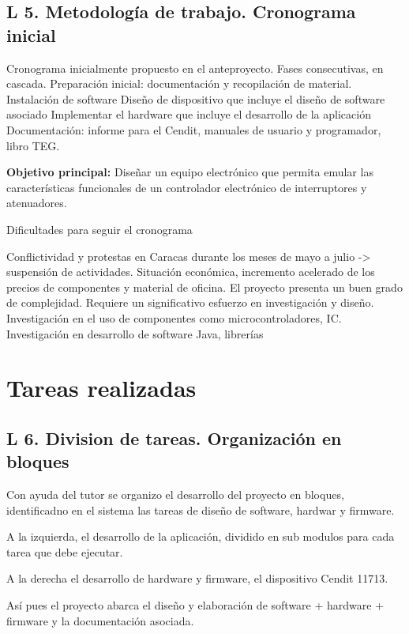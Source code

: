 \documentclass[paper=letter,oneside,fontsize=9pt]{scrartcl}
\begin{document}
	\subsection{L 5. Metodología de trabajo. Cronograma inicial}
	
	Cronograma inicialmente propuesto en el anteproyecto. Fases consecutivas, en cascada. 
	Preparación inicial: documentación y recopilación de material. Instalación de software
	Diseño de dispositivo que incluye el diseño de software asociado
	Implementar el hardware que incluye el desarrollo de la aplicación
	Documentación: informe para el Cendit, manuales de usuario y programador, libro TEG.
	
	\textbf{Objetivo principal:} Diseñar un equipo electrónico que permita emular las características funcionales de un controlador electrónico de interruptores y atenuadores.
	
	Dificultades para seguir el cronograma
	
	Conflictividad y protestas en Caracas durante los meses de mayo a julio -> suspensión de actividades.
	Situación económica, incremento acelerado de los precios de componentes y material de oficina.
	El proyecto presenta un buen grado de complejidad. Requiere un significativo esfuerzo en investigación y diseño. Investigación en el uso de componentes como microcontroladores, IC. Investigación en desarrollo de software Java, librerías
	
	\section{Tareas realizadas}
	
	\subsection{L 6. Division de tareas. Organización en bloques}
	
	
	Con ayuda del tutor se organizo el desarrollo del proyecto en bloques, identificadno en el sistema las tareas de diseño de software, hardwar y firmware. 
	
	A la izquierda, el desarrollo de la aplicación, dividido en sub modulos para cada tarea que debe ejecutar. 
	
	A la derecha el desarrollo de hardware y firmware, el dispositivo Cendit 11713.
	
	Así pues el proyecto abarca el diseño y elaboración de software + hardware + firmware y la documentación asociada.
	
\end{document}
